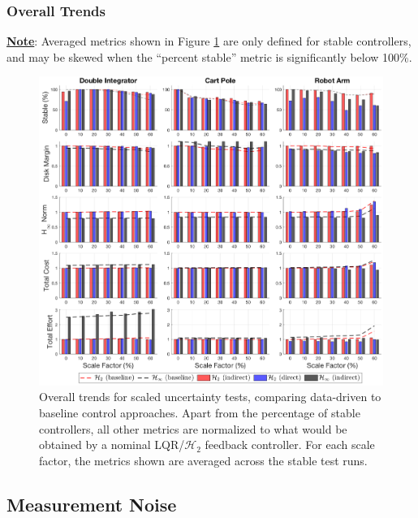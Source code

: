 \subsubsection{Overall Trends}
\underline{\textbf{Note}}: Averaged metrics shown in Figure \ref{fig:overall_trends_uncertainty_opt_bar} are only defined for stable controllers, and may be skewed when the ``percent stable'' metric is significantly below 100\%.
\begin{figure}[H]
\centering
	\includegraphics[width=\textwidth]{figures/overall_trends_uncertainty_opt_bar.png}
\caption{Overall trends for scaled uncertainty tests, comparing data-driven to baseline control approaches.  Apart from the percentage of stable controllers, all other metrics are normalized to what would be obtained by a nominal LQR/$\mathcal{H}_{2}$ feedback controller.  For each scale factor, the metrics shown are averaged across the stable test runs.}
\label{fig:overall_trends_uncertainty_opt_bar}
\end{figure}

\newpage
\subsection{Measurement Noise}
